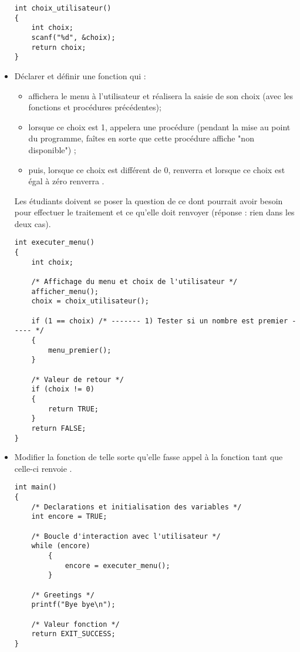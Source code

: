\begin{newenu}
\begin{itemize}
  \begin{correction}
{\footnotesize
\begin{verbatim}
int choix_utilisateur()
{
    int choix;
    scanf("%d", &choix);
    return choix;
}
\end{verbatim}
}
  \end{correction}

\item Déclarer et définir une fonction  qui :
  \begin{itemize}
  \item affichera le menu à l'utilisateur et réalisera la saisie de
    son choix (avec les fonctions et procédures précédentes);
  \item lorsque ce choix est 1, appelera une procédure
     (pendant la mise au point du programme, faîtes
    en sorte que cette procédure affiche "non disponible") ;
    \item puis, lorsque ce choix est différent de $0$, renverra  et lorsque ce choix est égal à zéro renverra .
  \end{itemize}

  \begin{correction}
    Les étudiants doivent se poser la question de ce dont pourrait
    avoir besoin  pour effectuer le traitement et ce
    qu'elle doit renvoyer (réponse : rien dans les deux cas).

{\footnotesize
\begin{verbatim}
int executer_menu()
{
    int choix;

    /* Affichage du menu et choix de l'utilisateur */
    afficher_menu();
    choix = choix_utilisateur();

    if (1 == choix) /* ------- 1) Tester si un nombre est premier ----- */
    {
        menu_premier(); 
    }

    /* Valeur de retour */
    if (choix != 0)
    {
        return TRUE;
    }
    return FALSE;
}
\end{verbatim}
}
  \end{correction}
\item Modifier  la fonction  de telle sorte qu'elle fasse appel à la fonction
   tant que celle-ci renvoie .
\begin{correction}
{\footnotesize
\begin{verbatim}
int main()
{
    /* Declarations et initialisation des variables */
    int encore = TRUE;
    
    /* Boucle d'interaction avec l'utilisateur */
    while (encore)
        {
            encore = executer_menu();
        }
    
    /* Greetings */
    printf("Bye bye\n");
    
    /* Valeur fonction */
    return EXIT_SUCCESS;
}
\end{verbatim}
}
  \end{correction}
\end{itemize}
\end{newenu}


